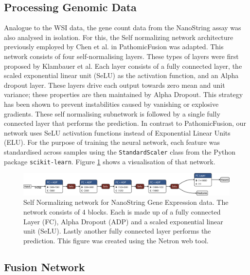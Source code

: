 \subsection{Processing Genomic Data}

Analogue to the WSI data, the gene count data from the NanoString assay was also analysed in isolation. For this, the Self normalizing network architecture previously employed by Chen et al. in PathomicFusion \cite{Chen2022Pathomic} was adapted. This network consists of four self-normalising layers. These types of layers were first proposed by Klambauer et al.\cite{Klambauer2017Self} Each layer consists of a fully connected layer, the scaled exponential linear unit (SeLU) as the activation function, and an Alpha dropout layer. These layers drive each output towards zero mean and unit variance; these properties are then maintained by Alpha Dropout. This strategy has been shown to prevent instabilities caused by vanishing or explosive gradients. \cite{Chen2022Pathomic}
These self normalising subnetwork is followed by a single fully connected layer that performs the prediction. In contrast to PathomicFusion, our network uses SeLU activation functions instead of Exponential Linear Units (ELU). For the purpose of training the neural network, each feature was standardised across samples using the \verb|StandardScaler| class from the Python package \verb|scikit-learn|. Figure \ref{fig:SNN} shows a visualisation of that network.

\begin{figure}[h!t]
    \centering
    \includegraphics[width=\textwidth]{latex/networks/genomic_snn.onnx_horz.png}
    \caption[Self Normalizing Network Diagram]{Self Normalizing network for NanoString Gene Expression data. The network consists of 4 blocks. Each is made up of a fully connected Layer (FC), Alpha Dropout (ADP) and a scaled exponential linear unit (SeLU). Lastly another fully connected layer performs the prediction. This figure was created using the Netron web tool. \cite{Roeder2023Netron}}
    \label{fig:SNN}
\end{figure}

\subsection{Fusion Network}

